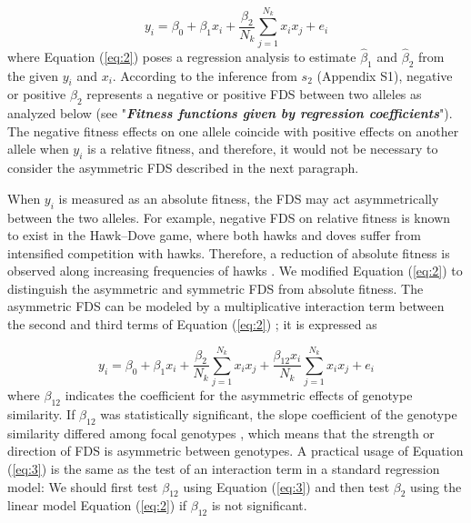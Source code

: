 \documentclass[12pt,]{article}
\begin{document}
\begin{equation}
y_i = \beta_0 + \beta_1x_i + \frac{\beta_2}{N_k}\sum^{N_{k}}_{j=1}{x_ix_j} + e_i \label{eq:2}
\end{equation}
\noindent
where Equation (\ref{eq:2}) poses a regression analysis to estimate $\hat{\beta}_1$ and $\hat{\beta}_2$ from the given $y_i$ and $x_i$. According to the inference from $s_2$ (Appendix S1), negative or positive $\beta_2$ represents a negative or positive FDS between two alleles as analyzed below (see "\textit{\textbf{Fitness functions given by regression coefficients}}"). The negative fitness effects on one allele coincide with positive effects on another allele when $y_i$ is a relative fitness, and therefore, it would not be necessary to consider the asymmetric FDS described in the next paragraph.

When $y_i$ is measured as an absolute fitness, the FDS may act asymmetrically between the two alleles. For example, negative FDS on relative fitness is known to exist in the Hawk--Dove game, where both hawks and doves suffer from intensified competition with hawks. Therefore, a reduction of absolute fitness is observed along increasing frequencies of hawks \citep[][see also Fig. \ref{figS3:FDSinbred}b]{takahashi2018balanced}. We modified Equation (\ref{eq:2}) to distinguish the asymmetric and symmetric FDS from absolute fitness. The asymmetric FDS can be modeled by a multiplicative interaction term between the second and third terms of Equation (\ref{eq:2}) \citep{sato2019neighbor}; it is expressed as 

\begin{equation}
y_i = \beta_0 + \beta_1x_i + \frac{\beta_2}{N_k}\sum^{N_{k}}_{j=1}{x_ix_j} + \frac{\beta_{12}x_i}{N_k}\sum^{N_{k}}_{j=1}{x_ix_j} + e_i \label{eq:3}
\end{equation}
\noindent
where $\beta_{12}$ indicates the coefficient for the asymmetric effects of genotype similarity. If $\beta_{12}$ was statistically significant, the slope coefficient of the genotype similarity differed among focal genotypes \citep{sato2019neighbor}, which means that the strength or direction of FDS is asymmetric between genotypes. A practical usage of Equation (\ref{eq:3}) is the same as the test of an interaction term in a standard regression model: We should first test $\beta_{12}$ using Equation (\ref{eq:3}) and then test $\beta_2$ using the linear model Equation (\ref{eq:2}) if $\beta_{12}$ is not significant.
\end{document}
